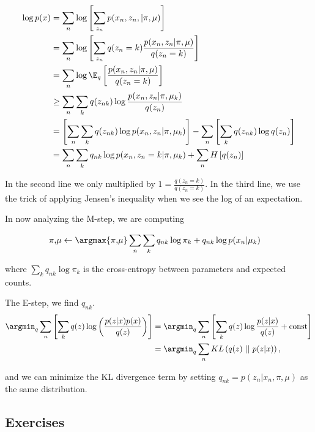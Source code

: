 \documentclass{article}
\begin{document}
\begin{align*}
\log p(x) &= \sum_n \log \left[\sum_{z_n} p(x_n, z_n, | \pi, \mu) \right]\\
&= \sum_n \log \left[ \sum_{z_n} q(z_n = k) \frac{p(x_n, z_n|\pi, \mu)}{q (z_n = k)} \right] \\
&= \sum_n \log \E_q \left[ \frac{p(x_n, z_n | \pi, \mu)}{q(z_n = k)}   \right] \\
&\ge \sum_n \sum_k q(z_{nk}) \log \frac{p(x_n, z_n |\pi, \mu_k)}{q(z_n)} \\
&= \left[\sum_n \sum_k q(z_{nk}) \log p(x_n, z_n |\pi, \mu_k) \right]- \sum_n \left[\sum_k q(z_{nk}) \log q(z_n)\right] \\
&= \sum_n \sum_k q_{nk} \log p(x_n, z_n = k | \pi, \mu_k) + \sum_n H\left[ q(z_n)\right]
\end{align*}

In the second line we only multiplied by $\displaystyle 1 = \frac{q(z_n  = k)}{q(z_n = k)}$.  In the third line, we use the trick of applying Jensen's inequality when we see the log of an expectation.

\smallskip

In now analyzing the M-step, we are computing 


\begin{align*}
\pi \text{,} \mu &\gets \argmax{\pi \text{,} \mu} \sum_n \sum_k q_{nk} 
\log \pi_k + q_{nk} \log p(x_n |  \mu_k)
\end{align*}

where $\displaystyle \sum_k q_{nk} \log \pi_k$ is the cross-entropy between parameters and expected counts.

The E-step, we find $q_{nk}$.  
\begin{align*}
\argmin_{q} \sum_{n} \left[ \sum_k q(z) \log \left(\frac{p(z|x) p(x)}{q(z)} \right) \right]	&= \argmin_q \sum_{n} \left[ \sum_k q(z) \log \frac{p(z|x)}{q(z)} + \text{const} \right] \\
&= \argmin_q \sum_n KL\left( q(z)\ ||\ p(z|x) \right),
\end{align*}

and we can minimize the KL divergence term by setting $q_{nk} = p(z_n | x_n, \pi,\mu)$ as the same distribution.

\smallskip

\subsection{Exercises}
\end{document}
